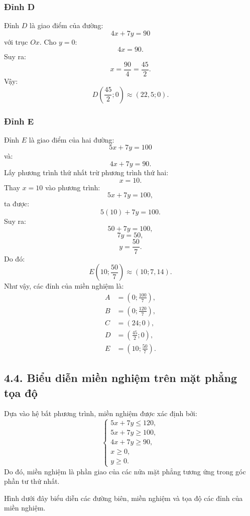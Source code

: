 \documentclass[12pt,a4paper]{article}
\begin{document}
\subsubsection*{Đỉnh D}
Đỉnh $D$ là giao điểm của đường:
\[
4x+7y=90
\]
với trục $Ox$.
Cho $y=0$:
\[
4x=90.
\]
Suy ra:
\[
x=\frac{90}{4}=\frac{45}{2}.
\]
Vậy:
\[
\boxed{
D\left(\frac{45}{2};0\right)
}
\approx(22,5;0).
\]
\subsubsection*{Đỉnh E}
Đỉnh $E$ là giao điểm của hai đường:
\[
5x+7y=100
\]
và:
\[
4x+7y=90.
\]
Lấy phương trình thứ nhất trừ phương trình thứ hai:
\[
x=10.
\]
Thay $x=10$ vào phương trình:
\[
5x+7y=100,
\]
ta được:
\[
5(10)+7y=100.
\]
Suy ra:
\[
50+7y=100,
\]
\[
7y=50,
\]
\[
y=\frac{50}{7}.
\]
Do đó:
\[
\boxed{
E\left(10;\frac{50}{7}\right)
}
\approx(10;7,14).
\]
Như vậy, các đỉnh của miền nghiệm là:
\[
\boxed{
\begin{aligned}
A&=\left(0;\frac{100}{7}\right),\\
B&=\left(0;\frac{120}{7}\right),\\
C&=(24;0),\\
D&=\left(\frac{45}{2};0\right),\\
E&=\left(10;\frac{50}{7}\right).
\end{aligned}}
\]


\subsection*{4.4. Biểu diễn miền nghiệm trên mặt phẳng tọa độ}

Dựa vào hệ bất phương trình, miền nghiệm được xác định bởi:
\[
\begin{cases}
5x+7y\leq120,\\
5x+7y\geq100,\\
4x+7y\geq90,\\
x\geq0,\\
y\geq0.
\end{cases}
\]
Do đó, miền nghiệm là phần giao của các nửa mặt phẳng tương ứng trong góc phần tư thứ nhất.

Hình dưới đây biểu diễn các đường biên, miền nghiệm và tọa độ các đỉnh của miền nghiệm.
\end{document}

